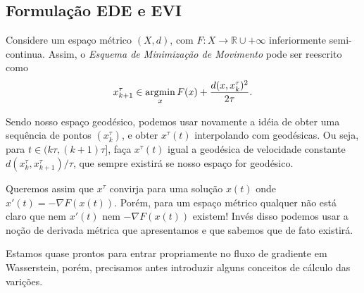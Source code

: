 
\subsection{Formulação EDE e EVI}

Considere um espaço métrico $(X,d)$, com $F:X\to \mathbb R\cup{+\infty}$ inferiormente
semi-continua. Assim, o \textit{Esquema de Minimização de Movimento} pode ser
reescrito como
\begin{equation}
    x_{k+1}^\tau \in \mathop{\rm argmin}_x F(x) + \frac{d(x,x_k^\tau)^2}{2\tau}.
    \label{metricEMM}
\end{equation}

Sendo nosso espaço geodésico, podemos usar novamente a idéia de obter
uma sequência de pontos $(x_k^\tau)$, e obter $x^\tau(t)$ interpolando com geodésicas.
Ou seja, para $t \in (k\tau,(k+1)\tau]$, faça $x^\tau(t)$ igual a geodésica
de velocidade constante $d(x_k^\tau,x_{k+1}^\tau)/\tau$, que sempre existirá se
nosso espaço for geodésico.

Queremos assim que $x^\tau$ convirja para uma solução $x(t)$ onde
$x'(t) = -\nabla F(x(t))$. Porém, para um espaço métrico qualquer
não está claro que nem $x'(t)$ nem $-\nabla F(x(t))$ existem!
Invés disso podemos usar a noção de derivada métrica que apresentamos e
que sabemos que de fato existirá.



Estamos quase prontos para entrar propriamente no fluxo de gradiente em Wasserstein,
porém, precisamos antes introduzir alguns conceitos de cálculo das varições.